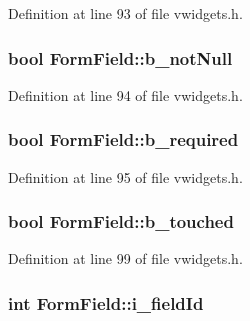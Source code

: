 Definition at line 93 of file vwidgets.h.

\hypertarget{classFormField_ad65ad13b03617a86b52ea49312aa9dac}{
\subsubsection[{b\_\-notNull}]{\setlength{\rightskip}{0pt plus 5cm}bool {\bf FormField::b\_\-notNull}}}
\label{classFormField_ad65ad13b03617a86b52ea49312aa9dac}


Definition at line 94 of file vwidgets.h.

\hypertarget{classFormField_ad99a28a6bd3a93e1e3917d95f29d3ed7}{
\subsubsection[{b\_\-required}]{\setlength{\rightskip}{0pt plus 5cm}bool {\bf FormField::b\_\-required}}}
\label{classFormField_ad99a28a6bd3a93e1e3917d95f29d3ed7}


Definition at line 95 of file vwidgets.h.

\hypertarget{classFormField_a09105b3e8fc915c9f2bf327fa2723723}{
\subsubsection[{b\_\-touched}]{\setlength{\rightskip}{0pt plus 5cm}bool {\bf FormField::b\_\-touched}}}
\label{classFormField_a09105b3e8fc915c9f2bf327fa2723723}


Definition at line 99 of file vwidgets.h.

\hypertarget{classFormField_a19f3e77df8c8caf716c3539f49405d96}{
\subsubsection[{i\_\-fieldId}]{\setlength{\rightskip}{0pt plus 5cm}int {\bf FormField::i\_\-fieldId}}}
\label{classFormField_a19f3e77df8c8caf716c3539f49405d96}


